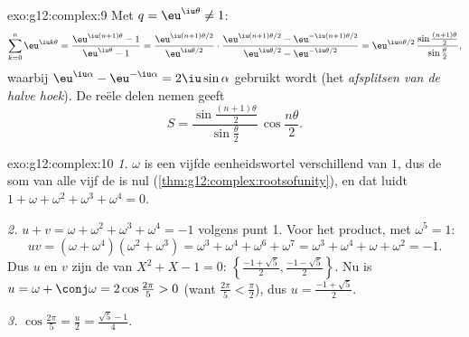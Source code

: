 \begin{solution}{exo:g12:complex:9}
Met $q = \eu^{\iu\theta} \neq 1$:
\[
\sum_{k=0}^{n} \eu^{\iu k\theta} = \frac{\eu^{\iu(n+1)\theta} - 1}{\eu^{\iu\theta} - 1}
= \frac{\eu^{\iu(n+1)\theta/2}}{\eu^{\iu\theta/2}}
\cdot\frac{\eu^{\iu(n+1)\theta/2} - \eu^{-\iu(n+1)\theta/2}}{\eu^{\iu\theta/2} - \eu^{-\iu\theta/2}}
= \eu^{\iu n\theta/2}\,
\frac{\sin\frac{(n+1)\theta}{2}}{\sin\frac{\theta}{2}},
\]
waarbij $\eu^{\iu\alpha} - \eu^{-\iu\alpha} = 2\iu\sin\alpha$ gebruikt wordt
(het \emph{afsplitsen van de halve hoek}). De reële delen nemen geeft
\[
S = \frac{\sin\frac{(n+1)\theta}{2}}{\sin\frac{\theta}{2}}\,
\cos\frac{n\theta}{2}.
\]
\end{solution}

\begin{solution}{exo:g12:complex:10}
\emph{1.} $\omega$ is een vijfde eenheidswortel verschillend van $1$, dus de
som van alle vijf de  is nul
(\cref{thm:g12:complex:rootsofunity}), en dat luidt
$1 + \omega + \omega^2 + \omega^3 + \omega^4 = 0$.

\emph{2.} $u + v = \omega + \omega^2 + \omega^3 + \omega^4 = -1$ volgens
punt 1. Voor het product, met $\omega^5 = 1$:
\[
uv = (\omega + \omega^4)(\omega^2 + \omega^3)
= \omega^3 + \omega^4 + \omega^6 + \omega^7
= \omega^3 + \omega^4 + \omega + \omega^2 = -1 .
\]
Dus $u$ en $v$ zijn de  van $X^2 + X - 1 = 0$:
$\left\{\frac{-1+\sqrt5}{2}, \frac{-1-\sqrt5}{2}\right\}$. Nu is
$u = \omega + \conj\omega = 2\cos\frac{2\pi}{5} > 0$ (want
$\frac{2\pi}{5} < \frac{\pi}{2}$), dus $u = \frac{-1 + \sqrt5}{2}$.

\emph{3.} $\cos\frac{2\pi}{5} = \frac u2 = \frac{\sqrt5 - 1}{4}$.
\end{solution}

